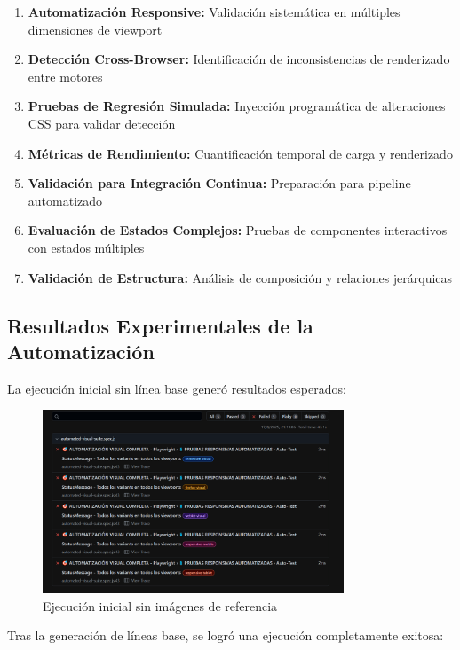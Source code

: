 \documentclass{article}
\begin{document}
\begin{enumerate}[nosep]
\item \textbf{Automatización Responsive:} Validación sistemática en múltiples dimensiones de viewport
\item \textbf{Detección Cross-Browser:} Identificación de inconsistencias de renderizado entre motores
\item \textbf{Pruebas de Regresión Simulada:} Inyección programática de alteraciones CSS para validar detección
\item \textbf{Métricas de Rendimiento:} Cuantificación temporal de carga y renderizado
\item \textbf{Validación para Integración Continua:} Preparación para pipeline automatizado
\item \textbf{Evaluación de Estados Complejos:} Pruebas de componentes interactivos con estados múltiples
\item \textbf{Validación de Estructura:} Análisis de composición y relaciones jerárquicas
\end{enumerate}

\subsection{Resultados Experimentales de la Automatización}

La ejecución inicial sin línea base generó resultados esperados:

\begin{figure}[H]
\centering
\includegraphics[width=0.8\textwidth]{playwright/3Automatizacion_sin_Baseline.png}
\caption{Ejecución inicial sin imágenes de referencia}
\label{fig:playwright-no-baseline}
\end{figure}

Tras la generación de líneas base, se logró una ejecución completamente exitosa:
\end{document}
